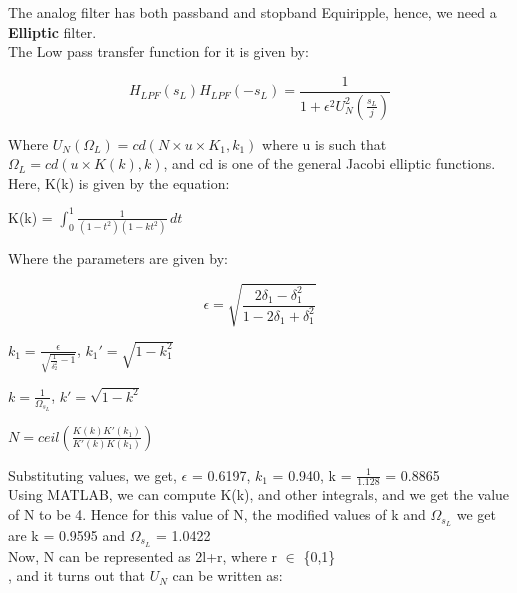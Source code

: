 \documentclass{article}
\begin{document}
The analog filter has both passband and stopband Equiripple, hence, we need a \textbf{Elliptic} filter.\\

The Low pass transfer function for it is given by:
\begin{center}
    \begin{equation*}
        H_{LPF}(s_L)H_{LPF}(-s_L) = \frac{1}{1+\epsilon^2U^2_N(\frac{s_L}{j})}
    \end{equation*}
\end{center}

Where $U_N(\Omega_L) = cd(N \times u \times K_1,k_1)$ where u is such that $\Omega_L = cd(u \times K(k),k)$, and cd is one of the general Jacobi elliptic functions. Here, K(k) is given by the equation:

\begin{center}
         K(k) = \(\int_{0}^{1} \frac{1}{(1-t^2)(1-kt^2)} \,dt\)
\end{center}

Where the parameters are given by:

\begin{center}
    \begin{equation*}
        \epsilon = \sqrt{\frac{2\delta_1-\delta_1^2}{1-2\delta_1+\delta_1^2}}
    \end{equation*}
\end{center}

\begin{center}
   $
        k_1 = \frac{\epsilon}{\sqrt{\frac{1}{\delta_2^2}-1}}$,       
       $ k_1'=\sqrt{1-k_1^2}
    $
\end{center}

\begin{center}
    $k=\frac{1}{\Omega_{s_L}}$,   $k'=\sqrt{1-k^2}$
\end{center}

\begin{center}
    $N = ceil(\frac{K(k)K'(k_1)}{K'(k)K(k_1)})$
\end{center}

Substituting values, we get, $\epsilon$ = 0.6197, $k_1$ = 0.940, k = $\frac{1}{1.128}$ = 0.8865\\
Using MATLAB, we can compute K(k), and other integrals, and we get the value of N to be 4. Hence for this value of N, the modified values of k and $\Omega_{s_L}$ we get are k = 0.9595 and $\Omega_{s_L}$ = 1.0422\\

Now, N can be represented as 2l+r, where r $\in$ \{0,1\}\\, and it turns out that $U_N$ can be written as:
\end{document}
